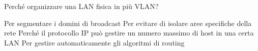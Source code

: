 \question
Perché organizzare una LAN fisica in più VLAN?

\begin{checkboxes}
	\choice Per segmentare i domini di broadcast
	\choice Per evitare di isolare aree specifiche della rete
	\choice Perché il protocollo IP può gestire un numero massimo di host in una certa LAN
	\choice Per gestire automaticamente gli algoritmi di routing
\end{checkboxes}
